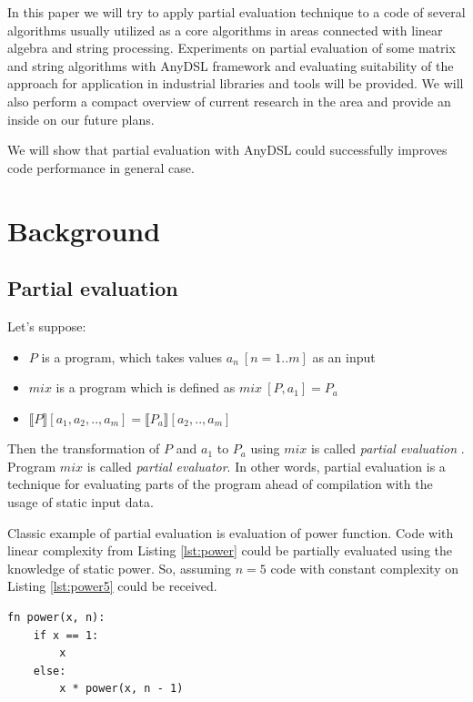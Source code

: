 \documentclass[conference]{IEEEtran}
\begin{document}
In this paper we will try to apply partial evaluation technique to a code of several algorithms usually utilized as a core algorithms in areas connected with linear algebra and string processing. Experiments on partial evaluation of some matrix and string algorithms with AnyDSL \cite{leissa2018anydsl} framework and evaluating suitability of the approach for application in industrial libraries and tools will be provided. We will also perform a compact overview of current research in the area and provide an inside on our future plans.

We will show that partial evaluation with AnyDSL could successfully improves code performance in general case.


\section{Background}

\subsection{Partial evaluation}

Let's suppose:

\begin{itemize}
	\item $P$ is a program, which takes values $a_n\ [n=1..m]$ as an input
	\item $mix$ is a program which is defined as $mix\ [P, a_1] = P_a$
	\item $\llbracket P \rrbracket [a_1, a_2, .., a_m] = \llbracket P_a \rrbracket [a_2, .., a_m]$
\end{itemize}
Then the transformation of $P$ and $a_1$ to $P_a$ using $mix$ is called \textit{partial evaluation} \cite{jones1993partial}. Program $mix$ is called \textit{partial evaluator}. In other words, partial evaluation is a technique for evaluating parts of the program ahead of compilation with the usage of static input data.

Classic example of partial evaluation is evaluation of power function. Code with linear complexity from Listing \ref{lst:power} could be partially evaluated using the knowledge of static power. So, assuming $n = 5$ code with constant complexity on Listing \ref{lst:power5} could be received.

\begin{lstlisting}[caption={Power function before evaluation},label={lst:power}]
fn power(x, n):
	if x == 1:
		x
	else:
		x * power(x, n - 1)
\end{lstlisting}
\end{document}
